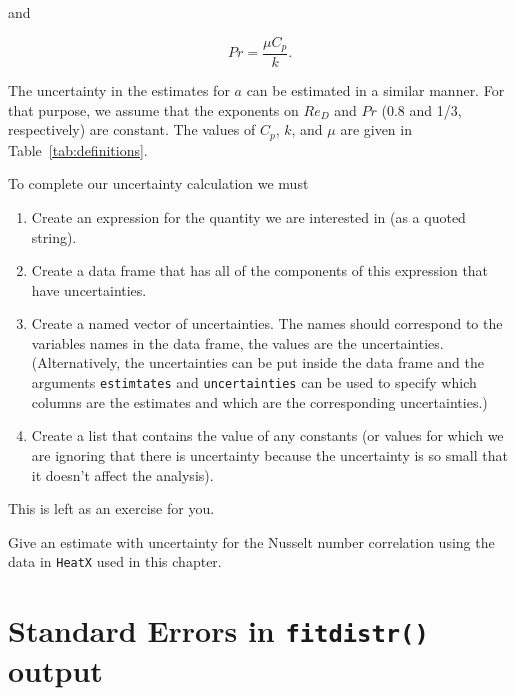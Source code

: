 \documentclass[twoside]{book}\usepackage[]{graphicx}\usepackage[]{xcolor}
\newcommand{\Rindex}[1]{\index{\texttt{#1}}}
\newcommand{\dataframe}[1]{{\color{blue!80!black}\texttt{#1}}\Rindex{#1}}
\newcommand{\option}[1]{{\color{brown!80!black}\texttt{#1}}}
\begin{document}
\noindent{}and

\begin{equation}
    Pr = \frac{\mu C_{p}}{k}.
\end{equation}

The uncertainty in the estimates for $a$ can be estimated in a similar manner.
For that purpose, we assume that the exponents on $Re_{D}$ and $Pr$
(0.8 and 1/3, respectively)
are constant.
The values of $C_{p}$, $k$, and $\mu$ are given in Table~\ref{tab:definitions}.

To complete our uncertainty calculation we must
\begin{enumerate}
	\item
		Create an expression for the quantity we are interested in (as a quoted string).
	\item
		Create a data frame that has all of the components of this expression
		that have uncertainties.
	\item
		Create a named vector of uncertainties.  The names should correspond 
		to the variables names in the data frame, the values are the uncertainties.
		(Alternatively, the uncertainties can be put inside the data frame and 
		the arguments \option{estimtates} and \option{uncertainties} can be 
		used to specify which columns are the estimates and which are the
		corresponding uncertainties.)
	\item
		Create a list that contains the value of any constants (or values for which
		we are ignoring that there is uncertainty because the uncertainty is so 
		small that it doesn't affect the analysis).
\end{enumerate}

This is left as an exercise for you.

\begin{problem}
	Give an estimate with uncertainty for the
	Nusselt number correlation using the data in \dataframe{HeatX} used
	in this chapter.
\end{problem}

\section{Standard Errors in \texttt{fitdistr()} output}
\end{document}
